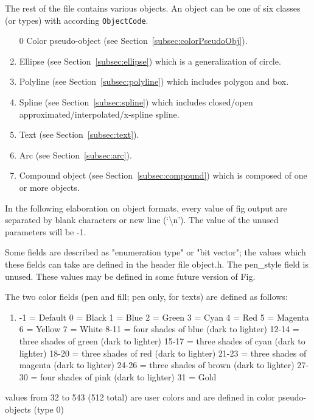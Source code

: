 \documentclass[10pt, a4paper]{article}
\begin{document}
The rest of the file contains various objects.  
An object can be one of six classes (or types) with according {\tt ObjectCode}.
%
\begin{enumerate}
\item[0]
Color pseudo-object (see Section~\ref{subsec:colorPseudoObj}). 
\item
Ellipse (see Section~\ref{subsec:ellipse}) which is a generalization of circle.
\item
Polyline (see Section~\ref{subsec:polyline}) which includes polygon and box.
\item
Spline (see Section~\ref{subsec:spline}) 
which includes closed/open approximated/interpolated/x-spline spline.
\item
Text (see Section~\ref{subsec:text}).
\item
Arc (see Section~\ref{subsec:arc}).
\item
Compound object (see Section~\ref{subsec:compound}) 
which is composed of one or more objects. 
\end{enumerate}

In the following elaboration on object formats, 
every value of fig output are separated by blank characters 
or new line (`\textbackslash n').  
The value of the unused parameters will be -1.

 Some fields are described as "enumeration type" or "bit vector"; the
 values which these fields can take are defined in the header file object.h.
 The pen\_style field is unused.
 These values may be defined in some future version of Fig.


The two color fields (pen and fill; pen only, for texts) are defined as follows:
%
\begin{enumerate}
\item
            -1 = Default
             0 = Black
             1 = Blue
             2 = Green
             3 = Cyan
             4 = Red
             5 = Magenta
             6 = Yellow
             7 = White
          8-11 = four shades of blue (dark to lighter)
         12-14 = three shades of green (dark to lighter)
         15-17 = three shades of cyan (dark to lighter)
         18-20 = three shades of red (dark to lighter)
         21-23 = three shades of magenta (dark to lighter)
         24-26 = three shades of brown (dark to lighter)
         27-30 = four shades of pink (dark to lighter)
            31 = Gold
\end{enumerate}

values from 32 to 543 (512 total) are user colors and
are defined in color pseudo-objects (type 0)
\end{document}
